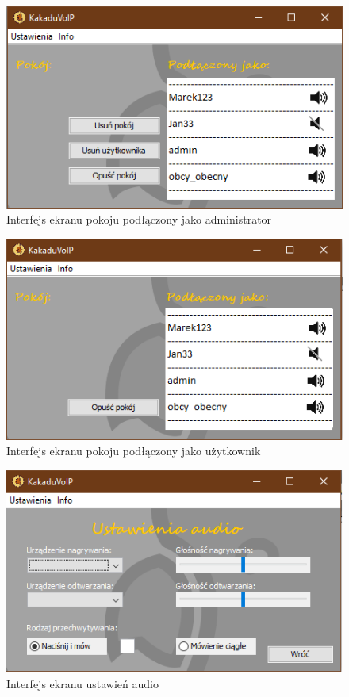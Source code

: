\documentclass{article}
\begin{document}
	\begin{figure}[H]
		\centering
		\includegraphics[scale=0.9]{1_4.png}
		\caption[]{Interfejs ekranu pokoju podłączony jako administrator}
		\label{fig:gui4}
	\end{figure}
	\begin{figure}[H]
		\centering
		\includegraphics[scale=0.9]{1_5.png}
		\caption[]{Interfejs ekranu pokoju podłączony jako użytkownik}
		\label{fig:gui5}
	\end{figure}
	\begin{figure}[H]
		\centering
		\includegraphics[scale=0.9]{1_6.png}
		\caption[]{Interfejs ekranu ustawień audio}
		\label{fig:gui6}
	\end{figure}
\end{document}
